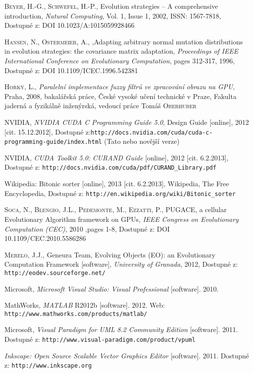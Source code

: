 \begin{thebibliography}{99}
        \textsc{Beyer}, H.-G., \textsc{Schwefel}, H.-P., Evolution strategies -- A comprehensive introduction, \textit{Natural Computing}, Vol. 1, Issue 1, 2002, ISSN: 1567-7818, Dostupné z: DOI 10.1023/A:1015059928466

        \textsc{Hansen}, N., \textsc{Ostermeier}, A., ,Adapting arbitrary normal mutation distributions in evolution strategies: the covariance matrix adaptation, \textit{Proceedings of IEEE International Conference on Evolutionary Computation}, pages 312-317, 1996, Dostupné z: DOI 10.1109/ICEC.1996.542381

        \textsc{Horký}, L., \textit{Paralelní implementace fuzzy filtrů ve zpracování obrazu na GPU}, Praha, 2008, bakalářská práce, České vysoké učení technické v Praze, Fakulta jaderná a fyzikálně inženýrská, vedoucí práce Tomáš \textsc{Oberhuber}

        NVIDIA, \textit{NVIDIA CUDA C Programming Guide 5.0}, \newline Design Guide [online], 2012 [cit. 15.12.2012], Dostupné z:\newline \texttt{http://docs.nvidia.com/cuda/cuda-c-programming-guide/index.html} (Tato nebo novější verze)

        NVIDIA, \textit{CUDA Toolkit 5.0: CURAND Guide} [online], 2012 [cit. 6.2.2013], Dostupné z: \texttt{http://docs.nvidia.com/cuda/pdf/CURAND\_Library.pdf}

        Wikipedia: Bitonic sorter [online], 2013 [cit. 6.2.2013], Wikipedia, The Free Encyclopedia, Dostupné z:
        \texttt{http://en.wikipedia.org/wiki/Bitonic\_sorter}

        \textsc{Soca}, N., \textsc{Blengio}, J.L., \textsc{Pedemonte}, M., \textsc{Ezzatti}, P., PUGACE, a cellular Evolutionary Algorithm framework on GPUs, \textit{IEEE Congress on Evolutionary Computation (CEC)}, 2010 ,pages 1-8, Dostupné z: DOI 10.1109/CEC.2010.5586286

        \textsc{Merelo}, J.J., Geneura Team, Evolving Objects (EO): an Evolutionary Computation Framework [software], \textit{University of Granada}, 2012, Dostupné z: \texttt{http://eodev.sourceforge.net/}

        Microsoft, \textit{Microsoft Visual Studio: Visual  Professional} [software]. 2010.

        MathWorks, \textit{MATLAB} R2012b [software]. 2012. \newline Web: \texttt{http://www.mathworks.com/products/matlab/}

        Microsoft, \textit{Visual Paradigm for UML 8.2 Community Edition} [software]. 2011.
         Dostupné z: {\tt http://www.visual-paradigm.com/product/vpuml}

        \textit{Inkscape: Open Source Scalable Vector Graphics Editor} [software]. 2011.
         Dostupné z: {\tt http://www.inkscape.org}

\end{thebibliography} 